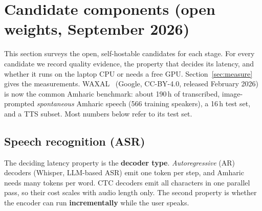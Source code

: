 \section{Candidate components (open weights, September 2026)}
\label{sec:components}

This section surveys the open, self-hostable candidates for each stage. For every candidate we
record quality evidence, the property that decides its latency, and whether it runs on the laptop
CPU or needs a free GPU. Section~\ref{sec:measure} gives the measurements.
WAXAL~\cite{waxal} (Google, CC-BY-4.0, released February 2026) is now the common Amharic
benchmark: about 190\,h of transcribed, image-prompted \emph{spontaneous} Amharic speech (566
training speakers), a 16\,h test set, and a TTS subset. Most numbers below refer to its test set.

\subsection{Speech recognition (ASR)}
The deciding latency property is the \textbf{decoder type}. \emph{Autoregressive} (AR) decoders
(Whisper, LLM-based ASR) emit one token per step, and Amharic needs many tokens per word. CTC decoders
emit all characters in one parallel pass, so their cost scales with audio length only. The second
property is whether the encoder can run \textbf{incrementally} while the user speaks.

